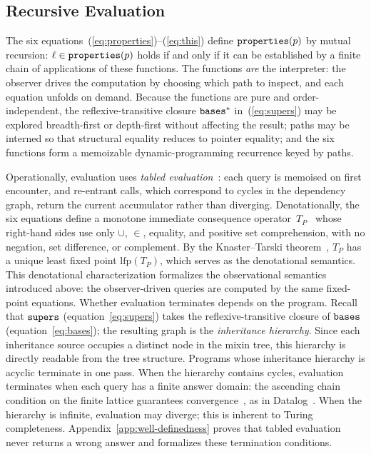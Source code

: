 \subsection{Recursive Evaluation}
The six equations~(\ref{eq:properties})--(\ref{eq:this})
define $\mathtt{properties}(p)$ by mutual recursion:
$\ell \in \mathtt{properties}(p)$ holds if and only if it can
be established by a finite chain of applications of
these functions.
The functions \emph{are} the interpreter: the observer
drives the computation by choosing which path to
inspect, and each equation unfolds on demand.
Because the functions are pure and order-independent,
the reflexive-transitive closure $\mathtt{bases}^*$
in~(\ref{eq:supers}) may be explored breadth-first or
depth-first without affecting the result;
paths may be interned so that structural equality
reduces to pointer equality;
and the six functions form a memoizable
dynamic-programming recurrence keyed by paths.

Operationally, evaluation uses \emph{tabled
evaluation}~\cite{tamaki1986-tabled-resolution}:
each query is memoised on first encounter, and
re-entrant calls, which correspond to cycles in the dependency graph,
return the current accumulator rather than diverging.
Denotationally, the six equations define a monotone
immediate consequence
operator~$T_P$~\cite{vanemden1976-predicate-logic-semantics}
whose right-hand sides use only $\cup$, $\in$, equality, and
positive set comprehension, with no negation, set
difference, or complement.
By the Knaster--Tarski
theorem~\cite{tarski1955-lattice-fixpoint-theorem}, $T_P$ has a unique
least fixed point $\mathrm{lfp}(T_P)$, which serves as
the denotational semantics.
This denotational characterization formalizes the observational
semantics introduced above: the observer-driven queries are
computed by the same fixed-point equations.
Whether evaluation terminates depends on the program.
Recall that $\mathtt{supers}$ (equation~\ref{eq:supers}) takes the
reflexive-transitive closure of $\mathtt{bases}$
(equation~\ref{eq:bases}); the resulting graph is the
\emph{inheritance hierarchy}.
Since each inheritance source occupies a distinct node in
the mixin tree, this hierarchy is directly readable from
the tree structure.
Programs whose inheritance hierarchy is acyclic terminate in
one pass.
When the hierarchy contains cycles,
evaluation terminates when each query has a finite
answer domain: the ascending chain condition on the finite
lattice guarantees
convergence~\cite{bancilhon1986-recursive-query-strategies},
as in Datalog~\cite{vanemden1976-predicate-logic-semantics}.
When the hierarchy is infinite, evaluation may
diverge; this is inherent to Turing completeness.
Appendix~\ref{app:well-definedness} proves that tabled
evaluation never returns a wrong answer and formalizes
these termination conditions.

